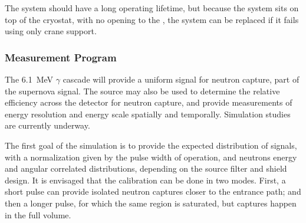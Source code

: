 The system should have a long operating lifetime, but because the  system sits on top of the cryostat, with no opening to the , the system can be replaced if it fails using only crane support.


\subsubsection{Measurement Program}
\label{sec:dp-calib-sys-pns-meas}

The \SI{6.1}{\MeV} $\gamma$ cascade will provide a uniform signal for neutron capture, part of the supernova signal. The source may also be used to determine the relative efficiency across the detector for neutron capture, and provide measurements of energy resolution and energy scale spatially and temporally. Simulation studies are currently underway.


The first goal of the simulation is to provide the expected distribution of signals, with a normalization given by the pulse width of  operation, and neutrons energy and angular correlated distributions, depending on the source filter and shield design.
It is envisaged that the calibration can be done in two modes. First, a short  pulse can provide isolated neutron captures closer to the entrance path; and then a longer 
pulse, for which the same region is saturated, but captures happen in the full volume.

